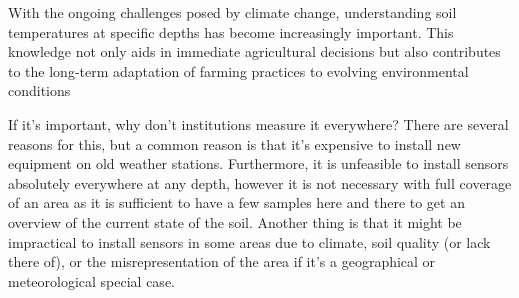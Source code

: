With the ongoing challenges posed by climate change, understanding soil temperatures at specific depths has become increasingly important. This knowledge not only aids in immediate agricultural decisions but also contributes to the long-term adaptation of farming practices to evolving environmental conditions





If it's important, why don't institutions measure it everywhere? There are several reasons for this, but a common reason is that it's expensive to install new equipment on old weather stations. Furthermore, it is unfeasible to install sensors absolutely everywhere at any depth, however it is not necessary with full coverage of an area as it is sufficient to have a few samples here and there to get an overview of the current state of the soil. Another thing is that it might be impractical to install sensors in some areas due to climate, soil quality (or lack there of), or the misrepresentation of the area if it's a geographical or meteorological special case.

